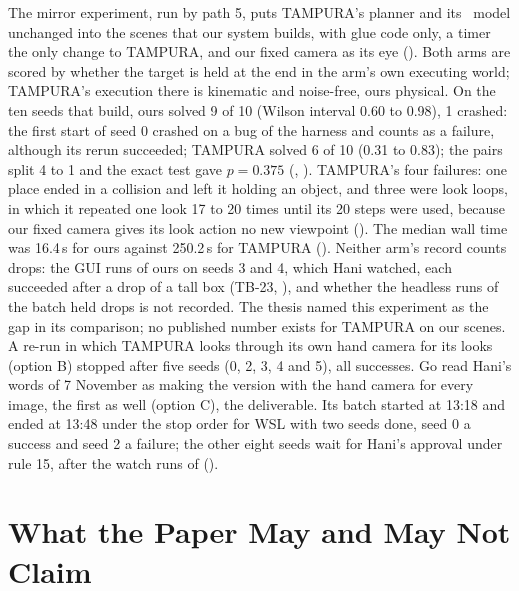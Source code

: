 The mirror experiment, run by path 5, puts TAMPURA's planner and its \fdice\ model
unchanged into the scenes that our system builds, with glue code only, a timer
the only change to TAMPURA, and our fixed camera as its eye (). Both arms are
scored by whether the target is held at the end in the arm's own executing world;
TAMPURA's execution there is kinematic and noise-free, ours physical. On the ten
seeds that build, ours solved 9 of 10 (Wilson interval 0.60 to 0.98), 1 crashed:
the first start of seed 0 crashed on a bug of the harness and counts as a failure,
although its rerun succeeded; TAMPURA solved 6 of 10 (0.31 to 0.83); the pairs split
4 to 1 and the exact test gave $p = 0.375$ (, ). TAMPURA's four failures: one place ended in a collision and
left it holding an object, and three were look loops, in which it repeated one look
17 to 20 times until its 20 steps were used, because our fixed camera gives its look
action no new viewpoint (). The median wall time was 16.4\,s for ours against
250.2\,s for TAMPURA (). Neither arm's record counts drops: the GUI runs of ours on
seeds 3 and 4, which Hani watched, each succeeded after a drop of a tall box (TB-23,
), and whether the headless runs of the batch held drops is not
recorded. The thesis named this experiment as the gap in its
comparison; no published number exists for TAMPURA on our scenes. A re-run in
which TAMPURA looks through its own hand camera for its looks (option B) stopped after
five seeds (0, 2, 3, 4 and 5), all successes. Go read Hani's words of 7 November as
making the version with the hand camera for every image, the first as well (option
C), the deliverable. Its batch started at 13:18 and ended at 13:48 under the stop
order for WSL with two seeds done, seed 0 a success and seed 2 a failure; the other
eight seeds wait for Hani's approval under rule 15, after the watch runs of
 (). 

\section{What the Paper May and May Not Claim}
\label{sec:claims}

